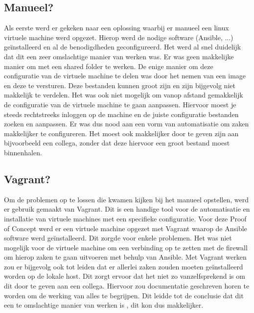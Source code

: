 \subsection{Manueel?}
Als eerste werd er gekeken naar een oplossing waarbij er manueel een linux virtuele machine werd opgezet. Hierop werd de nodige software (Ansible, ...) geïnstalleerd en al de benodigdheden geconfigureerd. Het werd al snel duidelijk dat dit een zeer omslachtige manier van werken was. Er was geen makkelijke manier om met een shared folder te werken. De enige manier om deze configuratie van de virtuele machine te delen was door het nemen van een image en deze te versturen. Deze bestanden kunnen groot zijn en zijn bijgevolg niet makkelijk te verdelen. Het was ook niet mogelijk om vanop afstand gemakkelijk de configuratie van de virtuele machine te gaan aanpassen. Hiervoor moest je steeds rechtstreeks inloggen op de machine en de juiste configuratie bestanden zoeken en aanpassen. Er was dus nood aan een vorm van automatisatie om zaken makkelijker te configureren. Het moest ook makkelijker door te geven zijn aan bijvoorbeeld een collega, zonder dat deze hiervoor een groot bestand moest binnenhalen. 
\subsection{Vagrant?}
Om de problemen op te lossen die kwamen kijken bij het manueel opstellen, werd er gebruik gemaakt van Vagrant. Dit is een handige tool voor de automatisatie en installatie van virtuele machines met een specifieke configuratie. Voor deze Proof of Concept werd er een virtuele machine opgezet met Vagrant waarop de Ansible software werd geïnstalleerd. Dit zorgde voor enkele problemen. Het was niet mogelijk voor de virtuele machine om een verbinding op te zetten met de firewall om hierop zaken te gaan uitvoeren met behulp van Ansible. Met Vagrant werken zou er bijgevolg ook tot leiden dat er allerlei zaken zouden moeten geïnstalleerd worden op de lokale host. Dit zorgt ervoor dat het niet zo vanzelfsprekend is om dit door te geven aan een collega. Hiervoor zou documentatie geschreven horen te worden om de werking van alles te begrijpen. Dit leidde tot de conclusie dat dit een te omslachtige manier van werken is , dit kon dus makkelijker. 
\newpage


